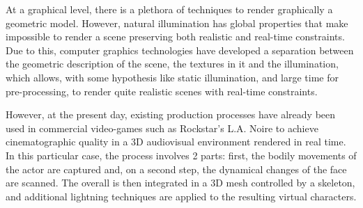 \documentclass[
		twoside,openright,titlepage,numbers=noenddot,manychapters,
		headinclude,%
                footinclude=false,cleardoublepage=empty,
                BCOR=5mm,
		fontsize=11pt, %
                 enabledeprecatedfontcommands]{scrreprt}
\begin{document}
At a graphical level, there is a plethora of techniques to render graphically a geometric model. However, natural illumination has global properties that make impossible to render a scene preserving both realistic and real-time constraints.
Due to this, computer graphics technologies have developed a separation between the geometric description of the scene, the textures in it and the illumination, which allows, with some hypothesis like static illumination, and large time for pre-processing, to render quite realistic scenes with real-time constraints.%





However, at the present day, existing production processes have already been used in commercial video-games such as Rockstar's L.A. Noire to achieve cinematographic quality in a 3D audiovisual environment rendered in real time. In this particular case, the process involves 2 parts: first, the bodily movements of the actor are captured and, on a second step, the dynamical changes of the face are scanned. The overall is then integrated in a 3D mesh controlled by a skeleton, and additional lightning techniques are applied to the resulting virtual characters.
\end{document}
